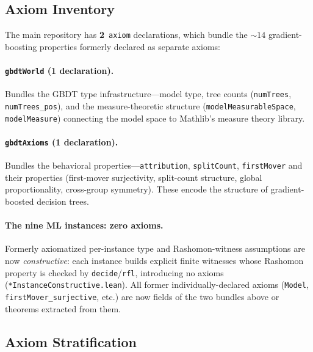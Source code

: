 \documentclass[11pt]{article}
\begin{document}
\subsection{Axiom Inventory}

The main repository has \textbf{2}~\texttt{axiom} declarations, which bundle
the ${\sim}14$ gradient-boosting properties formerly declared as separate
axioms:

\paragraph{\texttt{gbdtWorld} (1 declaration).}
Bundles the GBDT type infrastructure---model type, tree counts
(\texttt{numTrees}, \texttt{numTrees\_pos}), and the measure-theoretic
structure (\texttt{modelMeasurableSpace}, \texttt{modelMeasure}) connecting
the model space to Mathlib's measure theory library.

\paragraph{\texttt{gbdtAxioms} (1 declaration).}
Bundles the behavioral properties---\texttt{attribution}, \texttt{splitCount},
\texttt{firstMover} and their properties (first-mover surjectivity, split-count
structure, global proportionality, cross-group symmetry). These encode the
structure of gradient-boosted decision trees.

\paragraph{The nine ML instances: zero axioms.}
Formerly axiomatized per-instance type and Rashomon-witness assumptions are now
\emph{constructive}: each instance builds explicit finite witnesses whose
Rashomon property is checked by \texttt{decide}/\texttt{rfl}, introducing no
axioms (\texttt{*InstanceConstructive.lean}). All former individually-declared
axioms (\texttt{Model}, \texttt{firstMover\_surjective}, etc.) are now fields of
the two bundles above or theorems extracted from them.

\subsection{Axiom Stratification}
\end{document}
